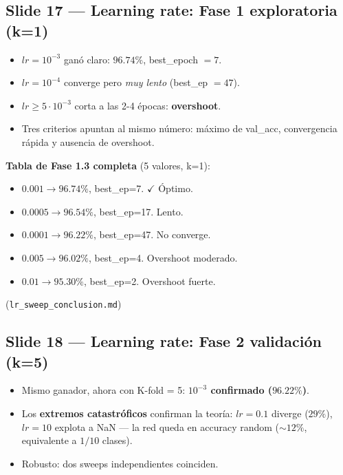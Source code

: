 \documentclass[11pt,a4paper]{article}
\newcommand{\nref}[1]{\textcolor{muted}{\small(\texttt{#1})}}
\begin{document}
\subsection{Slide 17 — Learning rate: Fase 1 exploratoria (k=1)}

\begin{decir}
\begin{itemize}[leftmargin=*,topsep=0pt]
  \item \textbf{$lr = 10^{-3}$} ganó claro: $96.74\%$, best\_epoch $= 7$.
  \item $lr = 10^{-4}$ converge pero \emph{muy lento} (best\_ep $= 47$).
  \item $lr \geq 5 \cdot 10^{-3}$ corta a las 2-4 épocas: \textbf{overshoot}.
  \item Tres criterios apuntan al mismo número: máximo de val\_acc, convergencia
        rápida y ausencia de overshoot.
\end{itemize}
\end{decir}

\begin{nota}
\textbf{Tabla de Fase 1.3 completa} (5 valores, k=1):
\begin{itemize}[leftmargin=*,topsep=2pt]
  \item $0.001 \to 96.74\%$, best\_ep=7. $\checkmark$ Óptimo.
  \item $0.0005 \to 96.54\%$, best\_ep=17. Lento.
  \item $0.0001 \to 96.22\%$, best\_ep=47. No converge.
  \item $0.005 \to 96.02\%$, best\_ep=4. Overshoot moderado.
  \item $0.01 \to 95.30\%$, best\_ep=2. Overshoot fuerte.
\end{itemize}
\nref{lr\_sweep\_conclusion.md}
\end{nota}

\subsection{Slide 18 — Learning rate: Fase 2 validación (k=5)}

\begin{decir}
\begin{itemize}[leftmargin=*,topsep=0pt]
  \item Mismo ganador, ahora con K-fold = 5: \textbf{$10^{-3}$ confirmado
        ($96.22\%$)}.
  \item Los \textbf{extremos catastróficos} confirman la teoría:
        $lr = 0.1$ diverge ($29\%$), $lr = 10$ explota a NaN — la red queda
        en accuracy random ($\sim 12\%$, equivalente a $1/10$ clases).
  \item Robusto: dos sweeps independientes coinciden.
\end{itemize}
\end{decir}
\end{document}
